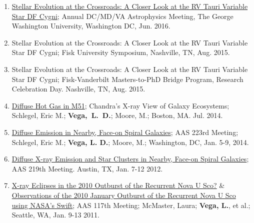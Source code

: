 \documentclass[letter,11pt]{article}
\begin{document}
\begin{enumerate}[\bfseries 1.]
\item \href{https://physics.columbian.gwu.edu/sites/g/files/zaxdzs1976/f/downloads/Astro2016_Conf_program_final.pdf}{Stellar  Evolution at the Crossroads: A Closer Look at the RV Tauri Variable Star DF Cygni};  Annual DC/MD/VA Astrophysics Meeting, The George Washington University, Washington DC, Jun. 2016.

\item Stellar Evolution at the Crossroads: A Closer Look at the RV Tauri Variable Star DF Cygni; Fisk University Symposium, Nashville, TN, Aug. 2015. 

\item Stellar Evolution at the Crossroads: A Closer Look at the RV Tauri Variable Star DF Cygni; Fisk-Vanderbilt Masters-to-PhD Bridge Program, Research Celebration Day. Nashville, TN, Aug. 2015. 

\item \href{http://adsabs.harvard.edu/abs/2014xvge.confE..38S}{Diffuse Hot Gas in M51}; Chandra’s X-ray View of Galaxy Ecosystems; Schlegel, Eric M.; \textbf{Vega,~L.~D.}; Moore, M.; Boston, MA. Jul. 2014.

\item \href{http://adsabs.harvard.edu/abs/2014AAS...22345311S}{Diffuse Emission in Nearby, Face-on Spiral Galaxies}; AAS 223rd Meeting; Schlegel, Eric M.; \textbf{Vega, L. D.}; Moore, M.; Washington, DC, Jan. 5-9, 2014.

\item \href{http://adsabs.harvard.edu/abs/2012AAS...21934630V}{Diffuse X-ray Emission and Star Clusters in Nearby, Face-on Spiral Galaxies}; AAS 219th Meeting. Austin, TX, Jan. 7-12 2012.

\item \href{http://adsabs.harvard.edu/abs/2011AAS...21733813M}{X-ray Eclipses in the 2010 Outburst of the Recurrent Nova U Sco?} \& \href{http://adsabs.harvard.edu/abs/2011AAS...21733812M}{Observations of the 2010 January Outburst of the Recurrent Nova U Sco using NASA's Swift}; AAS 117th Meeting; McMaster, Laura; \textbf{Vega, L.}, et al.; Seattle, WA, Jan. 9-13 2011. 





\end{enumerate}
\end{document}
